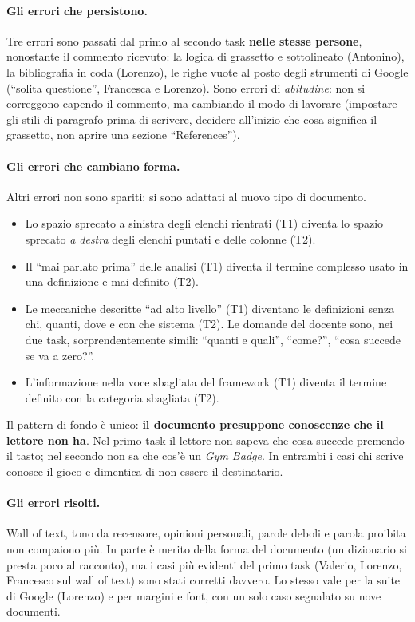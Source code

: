 \paragraph{Gli errori che persistono.} Tre errori sono passati dal primo al
secondo task \textbf{nelle stesse persone}, nonostante il commento ricevuto:
la logica di grassetto e sottolineato (Antonino), la bibliografia in coda
(Lorenzo), le righe vuote al posto degli strumenti di Google (``solita
questione'', Francesca e Lorenzo). Sono errori di \emph{abitudine}: non si
correggono capendo il commento, ma cambiando il modo di lavorare (impostare
gli stili di paragrafo prima di scrivere, decidere all'inizio che cosa
significa il grassetto, non aprire una sezione ``References'').

\paragraph{Gli errori che cambiano forma.} Altri errori non sono spariti: si
sono adattati al nuovo tipo di documento.
\begin{itemize}
  \item Lo spazio sprecato a sinistra degli elenchi rientrati (T1) diventa lo
        spazio sprecato \emph{a destra} degli elenchi puntati e delle colonne
        (T2).
  \item Il ``mai parlato prima'' delle analisi (T1) diventa il termine
        complesso usato in una definizione e mai definito (T2).
  \item Le meccaniche descritte ``ad alto livello'' (T1) diventano le
        definizioni senza chi, quanti, dove e con che sistema (T2). Le domande
        del docente sono, nei due task, sorprendentemente simili: ``quanti e
        quali'', ``come?'', ``cosa succede se va a zero?''.
  \item L'informazione nella voce sbagliata del framework (T1) diventa il
        termine definito con la categoria sbagliata (T2).
\end{itemize}
Il pattern di fondo è unico: \textbf{il documento presuppone conoscenze che
il lettore non ha}. Nel primo task il lettore non sapeva che cosa succede
premendo il tasto; nel secondo non sa che cos'è un \emph{Gym Badge}. In
entrambi i casi chi scrive conosce il gioco e dimentica di non essere il
destinatario.

\paragraph{Gli errori risolti.} Wall of text, tono da recensore, opinioni
personali, parole deboli e parola proibita non compaiono più. In parte è
merito della forma del documento (un dizionario si presta poco al racconto),
ma i casi più evidenti del primo task (Valerio, Lorenzo, Francesco sul wall
of text) sono stati corretti davvero. Lo stesso vale per la suite di Google
(Lorenzo) e per margini e font, con un solo caso segnalato su nove
documenti.

